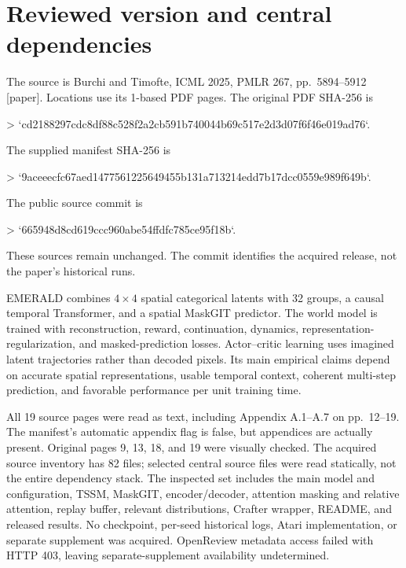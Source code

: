 \documentclass[10pt]{article}
\begin{document}
\section*{Reviewed version and central dependencies}
The source is Burchi and Timofte, ICML 2025, PMLR 267, pp. 5894–5912 [paper]. Locations use its 1-based PDF pages. The original PDF SHA-256 is\par
> `cd2188297cdc8df88c528f2a2cb591b740044b69c517e2d3d07f6f46e019ad76`.\par
The supplied manifest SHA-256 is\par
> `9aceeecfc67aed1477561225649455b131a713214edd7b17dcc0559e989f649b`.\par
The public source commit is\par
> `665948d8cd619ccc960abe54ffdfc785ce95f18b`.\par
These sources remain unchanged. The commit identifies the acquired release, not the paper’s historical runs.\par
EMERALD combines \(4\times4\) spatial categorical latents with 32 groups, a causal temporal Transformer, and a spatial MaskGIT predictor. The world model is trained with reconstruction, reward, continuation, dynamics, representation-regularization, and masked-prediction losses. Actor–critic learning uses imagined latent trajectories rather than decoded pixels. Its main empirical claims depend on accurate spatial representations, usable temporal context, coherent multi-step prediction, and favorable performance per unit training time.\par
All 19 source pages were read as text, including Appendix A.1–A.7 on pp. 12–19. The manifest’s automatic appendix flag is false, but appendices are actually present. Original pages 9, 13, 18, and 19 were visually checked. The acquired source inventory has 82 files; selected central source files were read statically, not the entire dependency stack. The inspected set includes the main model and configuration, TSSM, MaskGIT, encoder/decoder, attention masking and relative attention, replay buffer, relevant distributions, Crafter wrapper, README, and released results. No checkpoint, per-seed historical logs, Atari implementation, or separate supplement was acquired. OpenReview metadata access failed with HTTP 403, leaving separate-supplement availability undetermined.\par
\end{document}
